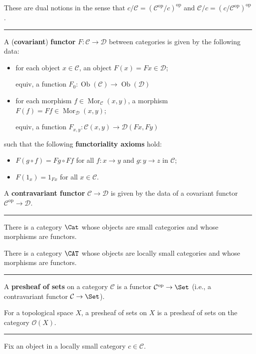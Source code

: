 \documentclass[12pt]{article}
\newcommand{\keyword}[1]{\textbf{#1}}
\newcommand{\sepline}{\rule{\textwidth}{0.4pt}}
\theoremstyle{definition}
\newcommand{\CC}{\mathcal{C}}
\newcommand{\DD}{\mathcal{D}}
\newcommand{\OO}{\mathcal{O}}
\newcommand{\<}{\left\langle}
\renewcommand{\>}{\right\rangle}
\DeclareMathOperator{\Ob}{Ob}
\DeclareMathOperator{\Mor}{Mor}
\newcommand{\op}{\mathrm{op}}
\begin{document}
These are dual notions in the sense that $c/\CC = (\CC^\op/c)^\op$ and $\CC/c = (c/\CC^\op)^\op$.

\sepline

A (\keyword{covariant}) \keyword{functor} $F : \CC \to \DD$ between categories is given by the following data:
\begin{itemize}
    \item for each object $x \in \CC$, an object $F(x) = Fx \in \DD$;

    equiv, a function $F_0 : \Ob(\CC) \to \Ob(\DD)$
    \item for each morphism $f \in \Mor_\CC(x, y)$, a morphism $F(f) = Ff \in \Mor_\DD(x, y)$;

    equiv, a function $F_{x,y} : \CC(x, y) \to \DD(Fx, Fy)$
\end{itemize}
such that the following \keyword{functoriality axioms} hold:
\begin{itemize}
    \item $F(g \circ f) = Fg \circ Ff$ for all $f : x \to y$ and $g : y \to z$ in $\CC$;
    \item $F(1_x) = 1_{Fx}$ for all $x \in \CC$.
\end{itemize}

A \keyword{contravariant functor} $\CC \to \DD$ is given by the data of a covariant functor $\CC^\op \to \DD$.

\sepline

There is a category $\Cat$ whose objects are small categories and whose morphisms are functors.

There is a category $\CAT$ whose objects are locally small categories and whose morphisms are functors.

\sepline

A \keyword{presheaf of sets} on a category $\CC$ is a functor $\CC^\op \to \Set$ (i.e., a contravariant functor $\CC \to \Set$).

For a topological space $X$, a presheaf of sets on $X$ is a presheaf of sets on the category $\OO(X)$.

\sepline

Fix an object in a locally small category $c \in \CC$.
\end{document}
